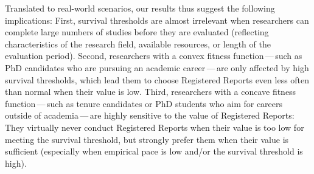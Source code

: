 \documentclass[
  ,man,mask,floatsintext]{apa6}
\begin{document}
Translated to real-world scenarios, our results thus suggest the following implications:
First, survival thresholds are almost irrelevant when
researchers can complete large numbers of studies before they are evaluated (reflecting characteristics of the research field, available resources, or length of the evaluation period).
Second, researchers with a convex fitness function\(\,\)---\(\,\)such as PhD candidates who are pursuing an academic career\(\,\)---\(\,\)are only affected by high survival thresholds, which lead them to choose Registered Reports even less often than normal when their value is low.
Third, researchers with a concave fitness function\(\,\)---\(\,\)such as tenure candidates or PhD students who aim for careers outside of academia\(\,\)---\(\,\)are highly sensitive to the value of Registered Reports:
They virtually never conduct Registered Reports when their value is too low for meeting the survival threshold, but strongly prefer them when their value is sufficient (especially when empirical pace is low and/or the survival threshold is high).
\end{document}
